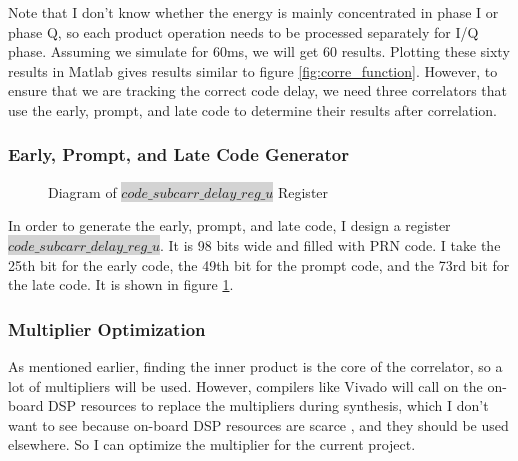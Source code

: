 Note that I don't know whether the energy is mainly concentrated in phase I or phase Q, so each product operation needs to be processed separately for I/Q phase. Assuming we simulate for 60ms, we will get 60 results. Plotting these sixty results in Matlab gives results similar to figure \ref{fig:corre_function}. However, to ensure that we are tracking the correct code delay, we need three correlators that use the early, prompt, and late code to determine their results after correlation.

\subsubsection{Early, Prompt, and Late Code Generator}
\begin{figure}[!htbp]
    \centering
    
    \caption{Diagram of \colorbox{lightgray}{$code\_subcarr\_delay\_reg\_u$} Register}
    \label{fig:prompt_code}
\end{figure}

In order to generate the early, prompt, and late code, I design a register\\ \colorbox{lightgray}{$code\_subcarr\_delay\_reg\_u$}. It is 98 bits wide and filled with PRN  code. I take the 25th bit for the early code, the 49th bit for the prompt code, and the 73rd bit for the late code. It is shown in figure \ref{fig:prompt_code}.

\subsubsection{Multiplier Optimization}
As mentioned earlier, finding the inner product is the core of the correlator, so a lot of multipliers will be used. However, compilers like Vivado will call on the on-board DSP resources to replace the multipliers during synthesis, which I don't want to see because on-board DSP resources are scarce \cite{RN208, RN209}, and they should be used elsewhere. So I can optimize the multiplier for the current project.

